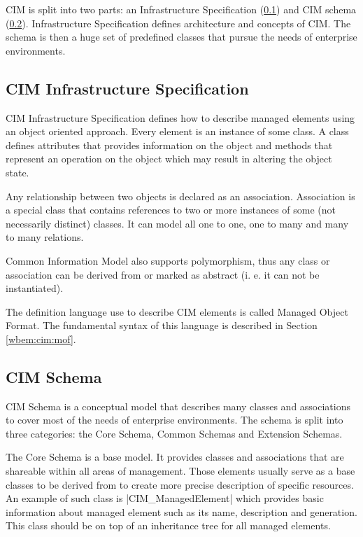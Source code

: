 CIM is split into two parts: an Infrastructure Specification (\ref{wbem:cim:is})
and CIM schema (\ref{wbem:cim:schema}).
Infrastructure Specification defines architecture and concepts of CIM. The
schema is then a huge set of predefined classes that pursue the needs of
enterprise environments.

\subsection{CIM Infrastructure Specification}
\label{wbem:cim:is}

CIM Infrastructure Specification defines how to describe managed elements using
an object oriented approach. Every element is an instance of some class. A class
defines attributes that provides information on the object and methods that
represent an operation on the object which may result in altering the object
state.

Any relationship between two objects is declared as an association. Association
is a special class that contains references to two or more instances of some
(not necessarily distinct) classes. It can model all one to one, one to many and
many to many relations.

Common Information Model also supports polymorphism, thus any class or
association can be derived from or marked as abstract (i. e. it can not be
instantiated).

The definition language use to describe CIM elements is called Managed Object
Format. The fundamental syntax of this language is described in Section
\ref{wbem:cim:mof}.

\subsection{CIM Schema}
\label{wbem:cim:schema}

CIM Schema is a conceptual model that describes many classes and associations to
cover most of the needs of enterprise environments. The schema is split into
three categories: the Core Schema, Common Schemas and Extension Schemas.

The Core Schema is a base model. It provides classes and associations that are
shareable within all areas of management. Those elements usually serve as a base
classes to be derived from to create more precise description of specific
resources. An example of such class is |CIM_ManagedElement| which provides basic
information about managed element such as its name, description and generation.
This class should be on top of an inheritance tree for all managed elements.

